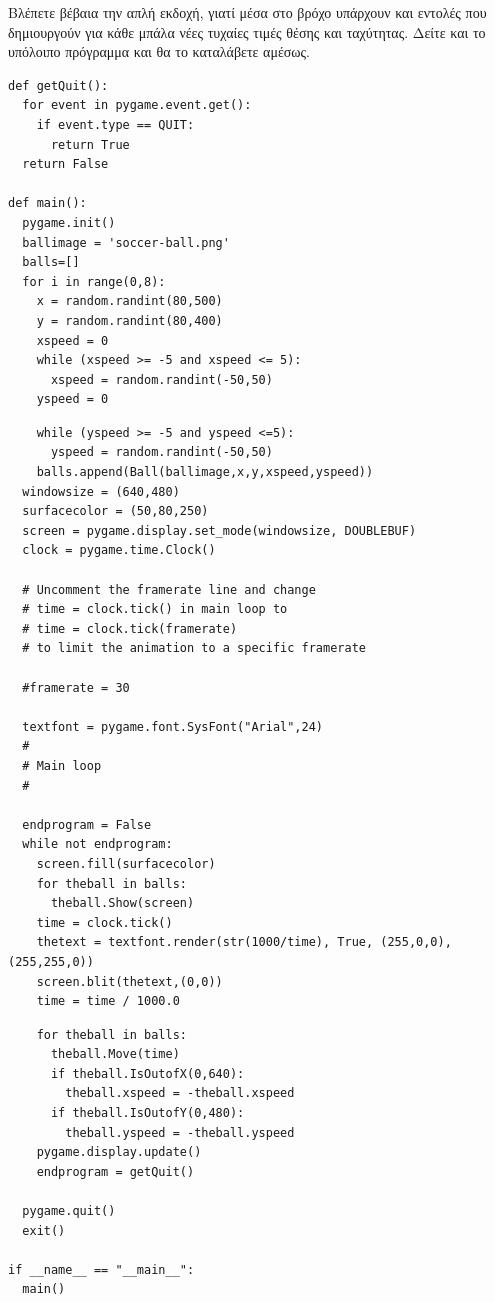Βλέπετε βέβαια την απλή εκδοχή, γιατί μέσα στο βρόχο υπάρχουν και εντολές
που δημιουργούν για κάθε μπάλα νέες τυχαίες τιμές θέσης και ταχύτητας.
Δείτε και το υπόλοιπο πρόγραμμα και θα το καταλάβετε αμέσως.

\begin{verbatim}
def getQuit():
  for event in pygame.event.get():
    if event.type == QUIT:
      return True
  return False

def main():
  pygame.init()
  ballimage = 'soccer-ball.png'
  balls=[]
  for i in range(0,8):
    x = random.randint(80,500)
    y = random.randint(80,400)
    xspeed = 0
    while (xspeed >= -5 and xspeed <= 5):
      xspeed = random.randint(-50,50)
    yspeed = 0
\end{verbatim}

\begin{verbatim}
    while (yspeed >= -5 and yspeed <=5):
      yspeed = random.randint(-50,50)
    balls.append(Ball(ballimage,x,y,xspeed,yspeed))
  windowsize = (640,480)
  surfacecolor = (50,80,250)
  screen = pygame.display.set_mode(windowsize, DOUBLEBUF)
  clock = pygame.time.Clock()

  # Uncomment the framerate line and change
  # time = clock.tick() in main loop to
  # time = clock.tick(framerate)
  # to limit the animation to a specific framerate

  #framerate = 30

  textfont = pygame.font.SysFont("Arial",24)
  #
  # Main loop
  #

  endprogram = False
  while not endprogram:
    screen.fill(surfacecolor)
    for theball in balls:
      theball.Show(screen)
    time = clock.tick()
    thetext = textfont.render(str(1000/time), True, (255,0,0),(255,255,0))
    screen.blit(thetext,(0,0))
    time = time / 1000.0
\end{verbatim}

\begin{verbatim}
    for theball in balls:
      theball.Move(time)
      if theball.IsOutofX(0,640):
        theball.xspeed = -theball.xspeed
      if theball.IsOutofY(0,480):
        theball.yspeed = -theball.yspeed
    pygame.display.update()
    endprogram = getQuit()

  pygame.quit()
  exit()

if __name__ == "__main__":
  main()
\end{verbatim}

